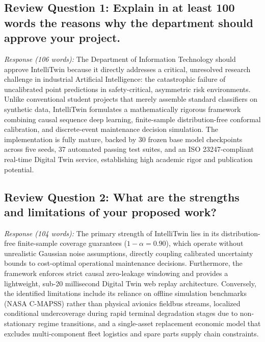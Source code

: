 \documentclass[12pt,a4paper]{article}
\begin{document}
\subsection*{Review Question 1: Explain in at least 100 words the reasons why the department should approve your project.}
\textit{Response (106 words):} The Department of Information Technology should approve IntelliTwin because it directly addresses a critical, unresolved research challenge in industrial Artificial Intelligence: the catastrophic failure of uncalibrated point predictions in safety-critical, asymmetric risk environments. Unlike conventional student projects that merely assemble standard classifiers on synthetic data, IntelliTwin formulates a mathematically rigorous framework combining causal sequence deep learning, finite-sample distribution-free conformal calibration, and discrete-event maintenance decision simulation. The implementation is fully mature, backed by 30 frozen base model checkpoints across five seeds, 37 automated passing test suites, and an ISO 23247-compliant real-time Digital Twin service, establishing high academic rigor and publication potential.

\subsection*{Review Question 2: What are the strengths and limitations of your proposed work?}
\textit{Response (104 words):} The primary strength of IntelliTwin lies in its distribution-free finite-sample coverage guarantees ($1-\alpha=0.90$), which operate without unrealistic Gaussian noise assumptions, directly coupling calibrated uncertainty bounds to cost-optimal operational maintenance decisions. Furthermore, the framework enforces strict causal zero-leakage windowing and provides a lightweight, sub-20 millisecond Digital Twin web replay architecture. Conversely, the identified limitations include its reliance on offline simulation benchmarks (NASA C-MAPSS) rather than physical avionics fieldbus streams, localized conditional undercoverage during rapid terminal degradation stages due to non-stationary regime transitions, and a single-asset replacement economic model that excludes multi-component fleet logistics and spare parts supply chain constraints.
\end{document}
